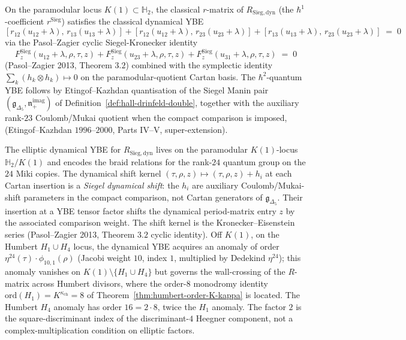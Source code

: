 \begin{proposition}
\label{prop:pasol-zagier-to-dynamical-YBE}
On the paramodular locus $K(1)\subset\mathbb{H}_2$, the classical $r$-matrix of
$R_{\mathrm{Sieg,dyn}}$ (the $\hbar^1$-coefficient $r^{\mathrm{Sieg}}$) satisfies the
classical dynamical YBE
\[
 [r_{12}(u_{12}+\lambda),\, r_{13}(u_{13}+\lambda)]
 + [r_{12}(u_{12}+\lambda),\, r_{23}(u_{23}+\lambda)]
 + [r_{13}(u_{13}+\lambda),\, r_{23}(u_{23}+\lambda)]
 \;=\;
 0
\]
via the Pasol--Zagier cyclic Siegel-Kronecker identity
\[
 F^{\mathrm{Sieg}}_z(u_{12}+\lambda,\rho,\tau,z)
 + F^{\mathrm{Sieg}}_z(u_{23}+\lambda,\rho,\tau,z)
 + F^{\mathrm{Sieg}}_z(u_{31}+\lambda,\rho,\tau,z)
 \;=\;
 0
\]
(Pasol--Zagier 2013, Theorem $3.2$) combined with the symplectic identity
$\sum_k (h_k\otimes h_k)\mapsto 0$ on the paramodular-quotient Cartan basis. The
$\hbar^2$-quantum YBE follows by Etingof--Kazhdan quantisation of the
Siegel Manin pair \((\mathfrak{g}_{\Delta_5},\mathfrak{n}_+^{\mathrm{imag}})\)
of Definition~\ref{def:hall-drinfeld-double}, together with the auxiliary
rank-$23$ Coulomb/Mukai quotient when the compact comparison is imposed,
(Etingof--Kazhdan $1996$--$2000$, Parts IV--V, super-extension).
\end{proposition}

\begin{remark}
\label{rem:elliptic-dynamical-YBE-K1}
The elliptic dynamical YBE for $R_{\mathrm{Sieg,dyn}}$ lives on the paramodular
$K(1)$-locus $\mathbb{H}_2/K(1)$ and encodes the braid relations for the rank-$24$
quantum group on the $24$ Miki copies. The dynamical shift kernel
$(\tau,\rho,z)\mapsto(\tau,\rho,z)+h_i$ at each Cartan insertion is a
\emph{Siegel dynamical shift}: the \(h_i\) are auxiliary
Coulomb/Mukai-shift parameters in the compact comparison, not Cartan
generators of \(\mathfrak g_{\Delta_5}\). Their insertion at a YBE
tensor factor shifts the dynamical period-matrix entry \(z\) by the
associated comparison weight.
The shift kernel is the Kronecker--Eisenstein series (Pasol--Zagier 2013,
Theorem $3.2$ cyclic identity). Off $K(1)$, on the Humbert $H_1\cup H_4$ locus, the
dynamical YBE acquires an anomaly of order $\eta^{24}(\tau)\cdot\phi_{10,1}(\rho)$
(Jacobi weight $10$, index $1$, multiplied by Dedekind $\eta^{24}$); this anomaly
vanishes on $K(1)\setminus\{H_1\cup H_4\}$ but governs the wall-crossing of the
$R$-matrix across Humbert divisors, where the order-$8$ monodromy identity
$\mathrm{ord}(H_1) = K^{\kappa_{\mathrm{ch}}} = 8$ of
Theorem~\ref{thm:humbert-order-K-kappa} is located. The Humbert
$H_4$ anomaly has order $16 = 2\cdot 8$, twice the $H_1$ anomaly. The factor
$2$ is the square-discriminant index of the discriminant-$4$ Heegner component,
not a complex-multiplication condition on elliptic factors.
\end{remark}

